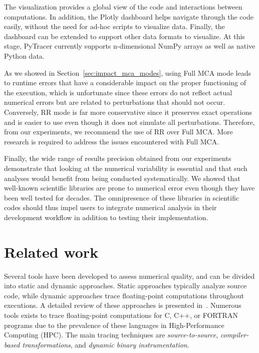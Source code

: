 \documentclass[11pt]{article}
\newcommand{\pytracer}[0]{PyTracer\xspace}
\begin{document}
The visualization provides a global view of the code and interactions between computations. In addition, the Plotly dashboard helps navigate through the code easily, without the need for ad-hoc scripts to visualize data. Finally, the dashboard can be extended to support other data formats to visualize. At this stage, \pytracer currently supports n-dimensional NumPy arrays as well as native Python data. 

As we showed in Section~\ref{sec:impact_mca_modes}, using Full MCA mode leads to runtime errors that have a considerable impact on the proper functioning of the execution, which is unfortunate since these errors do not reflect actual numerical errors but are related to perturbations that should not occur. Conversely, RR mode is far more conservative since it preserves exact operations and is easier to use even though it does not simulate all perturbations. Therefore, from our experiments, we recommend the use of RR over Full MCA. More research is required to address the issues encountered with Full MCA. 

Finally, the wide range of results precision obtained from our experiments demonstrate that looking at the numerical variability is essential and that such analyses would benefit from being conducted systematically.
We showed that well-known scientific libraries are prone to numerical error even though they have been well tested for decades.
The omnipresence of these libraries in scientific codes should thus impel users to integrate numerical analysis in their development workflow in addition to testing their implementation.

\section{Related work}

Several tools have been developed to assess numerical quality, and can be divided into static and dynamic approaches. Static approaches typically analyze source code, while dynamic approaches trace floating-point computations throughout executions. A detailed review of these approaches is presented in~\cite{cherubin2020tools}. 
Numerous tools exists to trace floating-point computations for C, C++, or FORTRAN programs due to the prevalence of these languages in High-Performance Computing (HPC). 
The main tracing techniques are \textit{source-to-source}, \textit{compiler-based transformations}, and \textit{dynamic binary instrumentation}.
\end{document}
